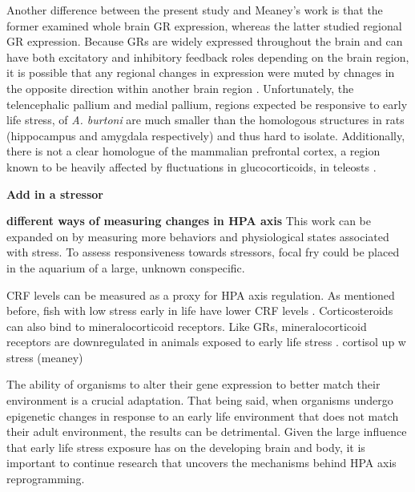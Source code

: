 \documentclass[12pt,twoside]{reedthesis}
\begin{document}
Another difference between the present study and Meaney's work is that the
former examined whole brain GR expression, whereas the latter studied regional
GR expression. Because GRs are widely expressed throughout the brain and can
have both excitatory and inhibitory feedback roles depending on the brain
region, it is possible that any regional changes in expression were muted by
chnages in the opposite direction within another brain region \citep{2017Nrid,
  herman_limbic_2005}. Unfortunately, the telencephalic pallium and medial
pallium, regions expected be responsive to early life stress, of
\textit{A. burtoni} are much smaller than the homologous structures in rats
(hippocampus and amygdala respectively) and thus hard to isolate. Additionally,
there is not a clear homologue of the mammalian prefrontal cortex, a region
known to be heavily affected by fluctuations in glucocorticoids, in teleosts
\citep{lupien_effects_2009, yamamoto_studies_2009}. 

\textbf{Add in a stressor}

\textbf{different ways of measuring changes in HPA axis}
This work can be expanded on by measuring more behaviors and physiological
states associated with stress. To assess responsiveness towards stressors, focal
fry could be placed in the aquarium of a large, unknown conspecific. 

CRF levels can be measured as a proxy for HPA axis regulation. As mentioned
before, fish with low stress early in life have lower CRF levels
\citep{taborsky_stable_2012}. Corticosteroids can also bind to
mineralocorticoid receptors. Like GRs, mineralocorticoid receptors are
downregulated in animals exposed to early life stress \citep{gass_mice_2001}. 
cortisol up w stress (meaney)

The ability of organisms to alter their gene expression to better match their environment is a crucial adaptation.
That being said, when organisms undergo epigenetic changes in response to an
early life environment that does not match their adult environment, the results
can be detrimental. Given the large influence that early life stress exposure has on the developing
brain and body, it is important to continue research that uncovers the
mechanisms behind HPA axis reprogramming.

\end{document}
